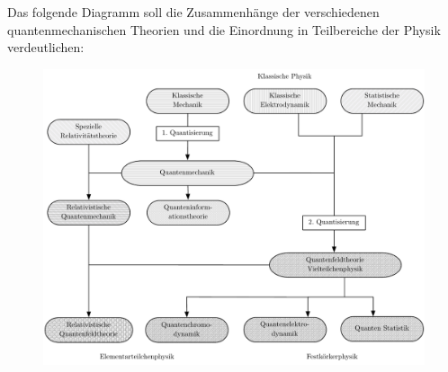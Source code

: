Das folgende Diagramm soll die Zusammenhänge der verschiedenen quantenmechanischen Theorien und die Einordnung in Teilbereiche der Physik verdeutlichen: 

\begin{figure}[b!]\center
\includegraphics[width=.95\linewidth]{Figs/overview.pdf}
\end{figure}

%